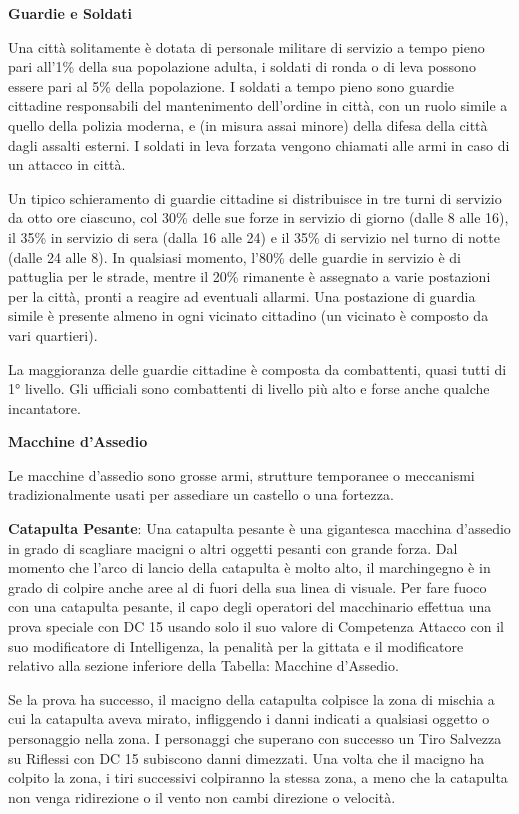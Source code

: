 \documentclass[a4paper,twoside,openany]{book}
\begin{document}
\begin{multicols}{2}
\textbf{Guardie e Soldati}

Una città solitamente è dotata di personale militare di servizio a tempo pieno pari all'1\% della sua popolazione adulta, i soldati di ronda o di leva possono essere pari al 5\% della popolazione. I soldati a tempo pieno sono guardie cittadine responsabili del mantenimento dell'ordine in città, con un ruolo simile a quello della polizia moderna, e (in misura assai minore) della difesa della città dagli assalti esterni. I soldati in leva forzata vengono chiamati alle armi in caso di un attacco in città.

Un tipico schieramento di guardie cittadine si distribuisce in tre turni di servizio da otto ore ciascuno, col 30\% delle sue forze in servizio di giorno (dalle 8 alle 16), il 35\% in servizio di sera (dalla 16 alle 24) e il 35\% di servizio nel turno di notte (dalle 24 alle 8). In qualsiasi momento, l'80\% delle guardie in servizio è di pattuglia per le strade, mentre il 20\% rimanente è assegnato a varie postazioni per la città, pronti a reagire ad eventuali allarmi. Una postazione di guardia simile è presente almeno in ogni vicinato cittadino (un vicinato è composto da vari quartieri).

La maggioranza delle guardie cittadine è composta da combattenti, quasi tutti di 1° livello. Gli ufficiali sono combattenti di livello più alto e forse anche qualche incantatore.

\textbf{Macchine d'Assedio}

Le macchine d'assedio sono grosse armi, strutture temporanee o meccanismi tradizionalmente usati per assediare un castello o una fortezza.

\textbf{Catapulta Pesante}: Una catapulta pesante è una gigantesca macchina d'assedio in grado di scagliare macigni o altri oggetti pesanti con grande forza. Dal momento che l'arco di lancio della catapulta è molto alto, il marchingegno è in grado di colpire anche aree al di fuori della sua linea di visuale. Per fare fuoco con una catapulta pesante, il capo degli operatori del macchinario effettua una prova speciale con DC 15 usando solo il suo valore di Competenza Attacco con il suo modificatore di Intelligenza, la penalità per la gittata e il modificatore relativo alla sezione inferiore della Tabella: Macchine d'Assedio.

Se la prova ha successo, il macigno della catapulta colpisce la zona di mischia a cui la catapulta aveva mirato, infliggendo i danni indicati a qualsiasi oggetto o personaggio nella zona. I personaggi che superano con successo un Tiro Salvezza su Riflessi con DC 15 subiscono danni dimezzati. Una volta che il macigno ha colpito la zona, i tiri successivi colpiranno la stessa zona, a meno che la catapulta non venga ridirezione o il vento non cambi direzione o velocità.


\end{multicols}
\end{document}
